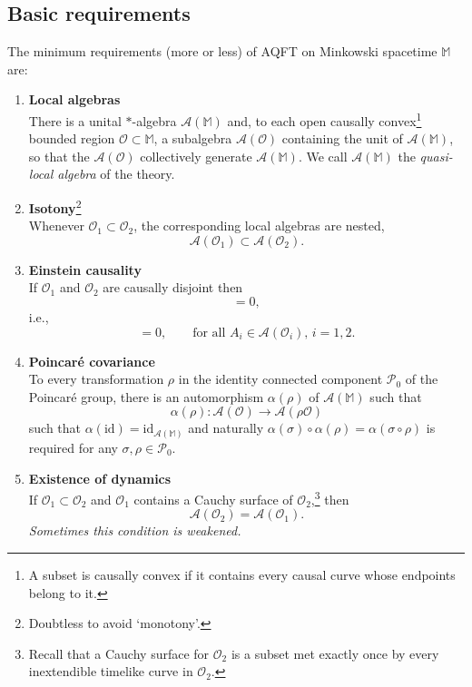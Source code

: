 \documentclass[12pt,a4paper]{article}
\newcommand{\1}{\mathds{1}}                         %
\newcommand{\Ocal}{\mathcal{O}}
\newcommand{\MM}{\mathbb{M}}
\newcommand{\Ac}{{\mathcal{A}}}
\newcommand{\Pc}{{\mathcal{P}}}
\newcommand{\id}{{\textrm{id}}}
\begin{document}
	\subsection{Basic requirements}
	The minimum requirements (more or less) of AQFT on Minkowski spacetime $\MM$ are:
	\begin{enumerate}[label=\bf A\arabic{enumi},leftmargin=*,widest=4] 
		\item\label{it:loc} {\bf Local algebras}\\
		There is a unital $*$-algebra $\Ac(\MM)$ and, 
		to each open causally convex\footnote{A subset is causally convex if it contains every causal curve whose endpoints belong to it.} bounded region $\Ocal\subset\MM$, a subalgebra $\Ac(\Ocal)$ containing the unit of $\Ac(\MM)$, so that the $\Ac(\Ocal)$ collectively generate $\Ac(\MM)$. We call $\Ac(\MM)$ the \emph{quasi-local algebra} of the theory.
		\item\label{it:iso} {\bf Isotony}\footnote{Doubtless to avoid `monotony'.}\\
		Whenever $\Ocal_1\subset \Ocal_2$, the corresponding local algebras are nested, 
		\begin{equation}
		 \Ac(\Ocal_1)\subset \Ac(\Ocal_2).
		\end{equation} 
		\item\label{it:Eins} {\bf Einstein causality}\\ If $\Ocal_1$ and $\Ocal_2$ are causally disjoint then
		\begin{equation}
		[\Ac(\Ocal_1),\Ac(\Ocal_2)] = 0,
		\end{equation}
		i.e., 
		\begin{equation}
			[ A_1, A_2] = 0,\qquad\text{for all $A_i\in\Ac(\Ocal_i)$, $i=1,2$}.
		\end{equation} 
		\item\label{it:Poinc} {\bf Poincar\'e covariance}\\
		To every transformation $\rho$ in the identity connected component $\Pc_0$ of the Poincar\'e group, there is an automorphism $\alpha(\rho)$ of $\Ac(\MM)$ such that
		\begin{equation}
		\alpha(\rho):\Ac(\Ocal)\to \Ac(\rho \Ocal)
		\end{equation}
		such that $\alpha(\id)=\id_{\Ac(\MM)}$
		and naturally $\alpha(\sigma) \circ\alpha(\rho)  = \alpha(\sigma\circ\rho)$ is required for any  $\sigma,\rho\in\Pc_0$.  
		\item\label{it:dyn} {\bf Existence of dynamics}\\
		If $\Ocal_1\subset \Ocal_2$ and $\Ocal_1$ contains a Cauchy surface of $\Ocal_2$,\footnote{Recall that a Cauchy surface for $\Ocal_2$ is a subset met exactly once by every inextendible timelike curve in $\Ocal_2$.} then 
		\begin{equation}
		\Ac(\Ocal_2) = \Ac(\Ocal_1).
		\end{equation}
	 \emph{Sometimes this condition is weakened.}
	\end{enumerate}
\end{document}
